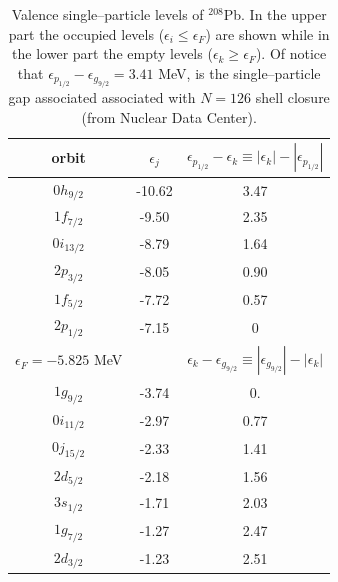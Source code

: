\begin{table}
\begin{tabular}{|c|c|c|}
\hline \rule[-2ex]{0pt}{5.5ex}   orbit& $\epsilon_j$  & $\epsilon_{p_{1/2}}-\epsilon_k\equiv|\epsilon_k|-|\epsilon_{p_{1/2}}|$  \\ 
\hline
$0h_{9/2}$&-10.62 &3.47\\
$1f_{7/2}$& -9.50&2.35\\
$0i_{13/2}$& -8.79&1.64\\
$2p_{3/2}$& -8.05&0.90\\
$1f_{5/2}$& -7.72&0.57\\
$2p_{1/2}$& -7.15&0\\
\hline \rule[-2ex]{0pt}{5.5ex}   $\epsilon_F=-5.825$ MeV&   & $\epsilon_k-\epsilon_{g_{9/2}}\equiv|\epsilon_{g_{9/2}}|-|\epsilon_k|$  \\ 
\hline
$1g_{9/2}$&-3.74 &0.\\
$0i_{11/2}$& -2.97&0.77\\
$0j_{15/2}$& -2.33&1.41\\
$2d_{5/2}$& -2.18&1.56\\
$3s_{1/2}$& -1.71&2.03\\
$1g_{7/2}$& -1.27&2.47\\
$2d_{3/2}$& -1.23&2.51\\
\hline
\end{tabular}\caption{Valence single--particle levels of $^{208}$Pb. In the upper part the occupied levels ($\epsilon_i\leq\epsilon_F$) are shown while in the lower part the empty levels ($\epsilon_k\geq\epsilon_F$). Of notice that $\epsilon_{p_{1/2}}-\epsilon_{g_{9/2}}=3.41$ MeV, is the single--particle gap associated associated with $N=126$ shell closure (from Nuclear Data Center).}\label{tab1E1}
 \end{table}
 
